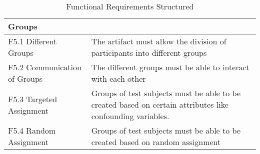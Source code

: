 \begin{table}
\begin{tabular}{L{0.35\textwidth}L{0.59\textwidth}}
    Groups                      &             \\ \hline
    F5.1 Different Groups           & The artifact must allow the division of participants into different groups            \\
    F5.2 Communication of Groups    & The different groups must be able to interact with each other            \\ 
    F5.3 Targeted Assignment        & Groups of test subjects must be able to be created based on certain attributes like confounding variables. \\
    F5.4 Random Assignment          & Groups of test subjects must be able to be created based on random assignment \\ \hline
    \end{tabular}
    \caption[Functional Requirements Structured]{Functional Requirements Structured}\label{tab:FuncRequirementsCat}
    \end{table}


